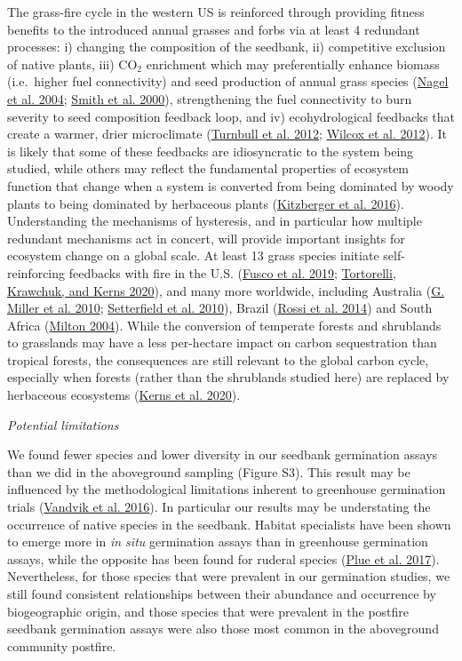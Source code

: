 \documentclass[
  12pt,
]{article}
\begin{document}
The grass-fire cycle in the western US is reinforced through providing
fitness benefits to the introduced annual grasses and forbs via at least
4 redundant processes: i) changing the composition of the seedbank, ii)
competitive exclusion of native plants, iii) CO\(_2\) enrichment which
may preferentially enhance biomass (i.e.~higher fuel connectivity) and
seed production of annual grass species
(\protect\hyperlink{ref-Nagel2004}{Nagel et al. 2004};
\protect\hyperlink{ref-Smith2000}{Smith et al. 2000}), strengthening the
fuel connectivity to burn severity to seed composition feedback loop,
and iv) ecohydrological feedbacks that create a warmer, drier
microclimate (\protect\hyperlink{ref-Turnbull2012}{Turnbull et al.
2012}; \protect\hyperlink{ref-Wilcox2012}{Wilcox et al. 2012}). It is
likely that some of these feedbacks are idiosyncratic to the system
being studied, while others may reflect the fundamental properties of
ecosystem function that change when a system is converted from being
dominated by woody plants to being dominated by herbaceous plants
(\protect\hyperlink{ref-Kitzberger2016}{Kitzberger et al. 2016}).
Understanding the mechanisms of hysteresis, and in particular how
multiple redundant mechanisms act in concert, will provide important
insights for ecosystem change on a global scale. At least 13 grass
species initiate self-reinforcing feedbacks with fire in the U.S.
(\protect\hyperlink{ref-Fusco2019}{Fusco et al. 2019};
\protect\hyperlink{ref-Tortorelli2020}{Tortorelli, Krawchuk, and Kerns
2020}), and many more worldwide, including Australia
(\protect\hyperlink{ref-Miller2010}{G. Miller et al. 2010};
\protect\hyperlink{ref-Setterfield2010}{Setterfield et al. 2010}),
Brazil (\protect\hyperlink{ref-Rossi2014}{Rossi et al. 2014}) and South
Africa (\protect\hyperlink{ref-Milton2004}{Milton 2004}). While the
conversion of temperate forests and shrublands to grasslands may have a
less per-hectare impact on carbon sequestration than tropical forests,
the consequences are still relevant to the global carbon cycle,
especially when forests (rather than the shrublands studied here) are
replaced by herbaceous ecosystems
(\protect\hyperlink{ref-Kerns2020}{Kerns et al. 2020}).

\emph{Potential limitations}

We found fewer species and lower diversity in our seedbank germination
assays than we did in the aboveground sampling (Figure S3). This result
may be influenced by the methodological limitations inherent to
greenhouse germination trials
(\protect\hyperlink{ref-Vandvik2016}{Vandvik et al. 2016}). In
particular our results may be understating the occurrence of native
species in the seedbank. Habitat specialists have been shown to emerge
more in \emph{in situ} germination assays than in greenhouse germination
assays, while the opposite has been found for ruderal species
(\protect\hyperlink{ref-Plue2017}{Plue et al. 2017}). Nevertheless, for
those species that were prevalent in our germination studies, we still
found consistent relationships between their abundance and occurrence by
biogeographic origin, and those species that were prevalent in the
postfire seedbank germination assays were also those most common in the
aboveground community postfire.
\end{document}
